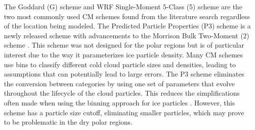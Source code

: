 The Goddard (G) scheme \citep{tao:2000} and WRF Single-Moment 5-Class (5) scheme \citep{hong:2004} are the two most commonly used CM schemes found from the literature search regardless of the location being modeled. The Predicted Particle Properties (P3) scheme is a newly released scheme with advancements to the Morrison Bulk Two-Moment (2) scheme \citep{milbrandt:2016, morrison:2015}. This scheme was not designed for the polar regions but is of particular interest due to the way it parameterizes ice particle density. Many CM schemes use bins to classify different cold cloud particle sizes and densities, leading to assumptions that can potentially lead to large errors. The P3 scheme eliminates the conversion between categories by using one set of parameters that evolve throughout the lifecycle of the cloud particles. This reduces the simplifications often made when using the binning approach for ice particles \citep{morrison:2005}. However, this scheme has a particle size cutoff, eliminating smaller particles, which may prove to be problematic in the dry polar regions.

